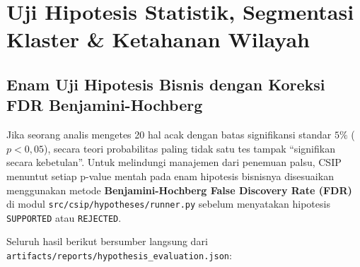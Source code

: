 \documentclass[11pt,a4paper,oneside]{book}
\newcommand{\code}[1]{{\small\nolinkurl{#1}}}
\begin{document}
\chapter{Uji Hipotesis Statistik, Segmentasi Klaster \& Ketahanan Wilayah}

\section{Enam Uji Hipotesis Bisnis dengan Koreksi FDR Benjamini-Hochberg}

\begin{bisnisbox}
Jika seorang analis mengetes 20 hal acak dengan batas signifikansi standar $5\%$ ($p < 0{,}05$), secara teori probabilitas paling tidak satu tes tampak ``signifikan secara kebetulan''. Untuk melindungi manajemen dari penemuan palsu, CSIP menuntut setiap p-value mentah pada enam hipotesis bisnisnya disesuaikan menggunakan metode \textbf{Benjamini-Hochberg False Discovery Rate (FDR)} di modul \code{src/csip/hypotheses/runner.py} sebelum menyatakan hipotesis \code{SUPPORTED} atau \code{REJECTED}.
\end{bisnisbox}

Seluruh hasil berikut bersumber langsung dari \code{artifacts/reports/hypothesis_evaluation.json}:
\end{document}
